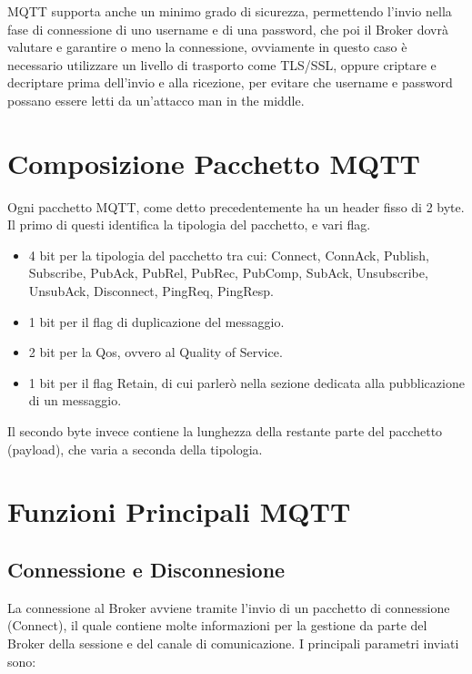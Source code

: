 \documentclass{article}
\begin{document}
MQTT supporta anche un minimo grado di sicurezza, permettendo l'invio nella fase di connessione di uno username e di una password, che poi il Broker dovrà valutare e garantire o meno la connessione, ovviamente in questo caso è necessario utilizzare un livello di trasporto come TLS/SSL, oppure criptare e decriptare prima dell'invio e alla ricezione, per evitare che username e password possano essere letti da un'attacco man in the middle.


\section{Composizione Pacchetto MQTT}
Ogni pacchetto MQTT, come detto precedentemente ha un header fisso di 2 byte. Il primo di questi identifica la tipologia del pacchetto, e vari flag.
\begin{itemize}
	\item 4 bit per la tipologia del pacchetto tra cui: Connect, ConnAck, Publish, Subscribe, PubAck, PubRel, PubRec, PubComp, SubAck, Unsubscribe, UnsubAck, Disconnect, PingReq, PingResp.
	\item 1 bit per il flag di duplicazione del messaggio.
	\item 2 bit per la Qos, ovvero al Quality of Service.
	\item 1 bit per il flag Retain, di cui parlerò nella sezione dedicata alla pubblicazione di un messaggio.

\end{itemize}Il secondo byte invece contiene la lunghezza della restante parte del pacchetto (payload), che varia a seconda della tipologia.

\section{Funzioni Principali MQTT}

\subsection{Connessione e Disconnesione}
La connessione al Broker avviene tramite l'invio di un pacchetto di connessione (Connect), il quale contiene molte informazioni per la gestione da parte del Broker della sessione e del canale di comunicazione. I principali parametri inviati sono:
\end{document}
